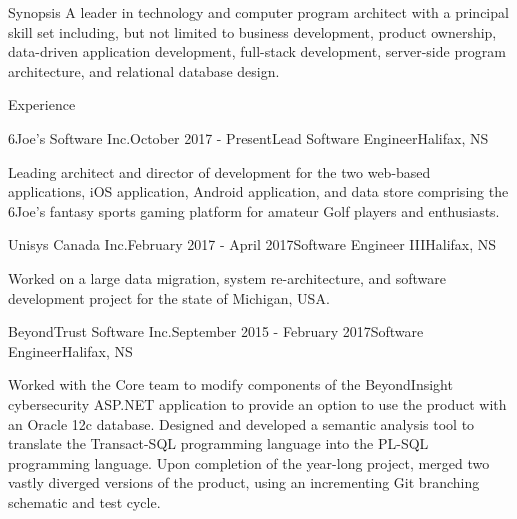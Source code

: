 \documentclass{resume} %
\begin{document}
\begin{rSection}{Synopsis}
A leader in technology and computer program architect with a principal skill set including, but not limited to business development, product ownership, data-driven application development, full-stack development, server-side program architecture, and relational database design.
\end{rSection}


\begin{rSection}{Experience}

\begin{rSubsection}{6Joe's Software Inc.}{October 2017 - Present}{Lead Software Engineer}{Halifax, NS}

\item[] Leading architect and director of development for the two web-based applications, iOS application, Android application, and data store comprising the 6Joe's fantasy sports gaming platform for amateur Golf players and enthusiasts.

\end{rSubsection}


\begin{rSubsection}{Unisys Canada Inc.}{February 2017 - April 2017}{Software Engineer III}{Halifax, NS}

\item[] Worked on a large data migration, system re-architecture, and software development project for the state of Michigan, USA.

\end{rSubsection}


\begin{rSubsection}{BeyondTrust Software Inc.}{September 2015 - February 2017}{Software Engineer}{Halifax, NS}

\item[] Worked with the Core team to modify components of the BeyondInsight cybersecurity ASP.NET application to provide an option to use the product with an Oracle 12c database. Designed and developed a semantic analysis tool to translate the Transact-SQL programming language into the PL-SQL programming language. Upon completion of the year-long project, merged two vastly diverged versions of the product, using an incrementing Git branching schematic and test cycle.


\end{rSubsection}
\end{rSection}
\end{document}
